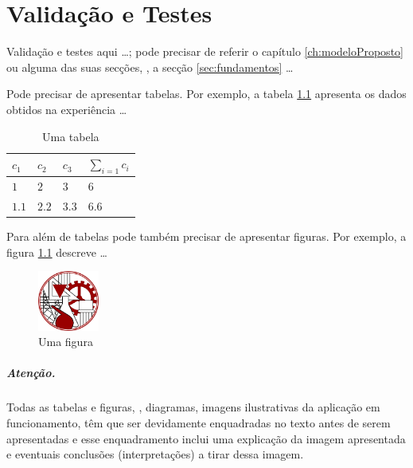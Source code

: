 \chapter{Validação e Testes}
\label{ch:validacaoTestes}

Validação e testes aqui \ldots; pode precisar de referir o capítulo \ref{ch:modeloProposto} ou alguma das suas secções, \eg, a secção \ref{sec:fundamentos} \ldots

Pode precisar de apresentar tabelas. Por exemplo, a tabela \ref{tab:umaTabela} apresenta os dados obtidos na experiência \ldots
\begin{table}[h]
   \centering
   \begin{tabular}{l|l|l|l}
      $c_1$ & $c_2$ & $c_3$ & $\sum_{i=1} c_i$
      \\
      \hline \hline
      $1$ & $2$ & $3$ & $6$
      \\ \hline
      $1.1$ & $2.2$ & $3.3$ & $6.6$
      \\
      \hline \hline
   \end{tabular}
\caption{Uma tabela}
\label{tab:umaTabela}
\end{table}

Para além de tabelas pode também precisar de apresentar figuras. Por exemplo, a figura \ref{fig:umafigura} descreve \ldots
\begin{figure}[H][h]
   \centering
   \includegraphics[width=2cm]{./fig_logo_ISEL}
\caption{Uma figura}
\label{fig:umafigura}
\end{figure}
\noindent

\paragraph{Atenção.} Todas as tabelas e figuras, \eg, diagramas, imagens ilustrativas da aplicação em funcionamento, têm que ser devidamente enquadradas no texto antes de serem apresentadas e esse enquadramento inclui uma explicação da imagem apresentada e eventuais conclusões (interpretações) a tirar dessa imagem.


